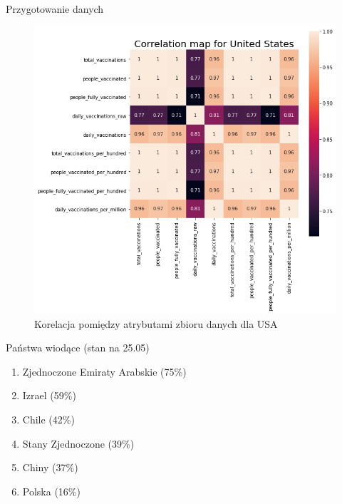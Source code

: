 \documentclass[11pt]{beamer}
\begin{document}
\begin{frame}{Przygotowanie danych}
\begin{figure}
\includegraphics[scale=0.4]{../img/usa_corr.png} 
\caption{Korelacja pomiędzy atrybutami zbioru danych dla USA}
\end{figure}
\end{frame}

\begin{frame}{Państwa wiodące (stan na 25.05)}
\begin{enumerate}
\item<3-> Zjednoczone Emiraty Arabskie (75\%)
\item<1-> Izrael (59\%)
\item<4-> Chile (42\%)
\item<2-> Stany Zjednoczone (39\%)
\item<5-> Chiny (37\%)
\item<6-> Polska (16\%)
\end{enumerate}
\end{frame}
\end{document}
